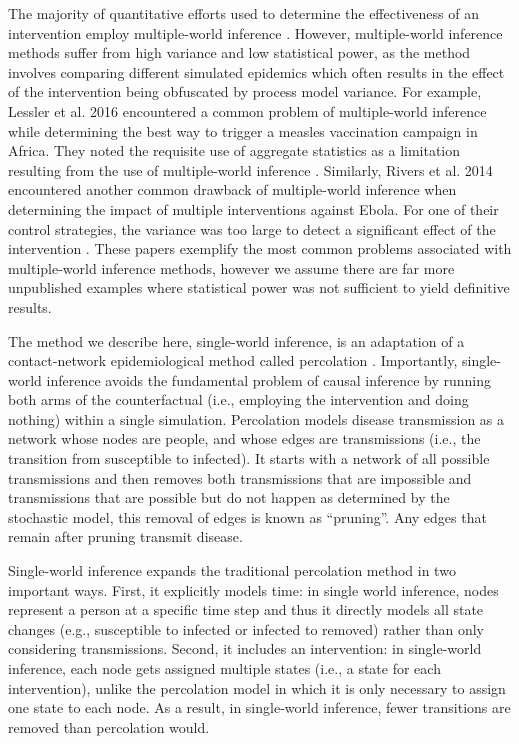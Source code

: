 \documentclass[PTRSB]{rsos}
\begin{document}
\begin{multicols}{2}
The majority of quantitative efforts used to determine the effectiveness of an intervention employ multiple-world inference \cite{lessler-et-al:2016,rivers-et-al:2014,daughton-et-al:2017,longini-et-al:2005}.
However, multiple-world inference methods suffer from high variance and low statistical power, as the method involves comparing different simulated epidemics which often results in the effect of the intervention being obfuscated by process model variance.
For example, Lessler et al. 2016 encountered a common problem of multiple-world inference while determining the best way to trigger a measles vaccination campaign in Africa. 
They noted the requisite use of aggregate statistics as a limitation resulting from the use of multiple-world inference \cite{lessler-et-al:2016}.
Similarly, Rivers et al. 2014 encountered another common drawback of multiple-world inference when determining the impact of multiple interventions against Ebola.
For one of their control strategies, the variance was too large to detect a significant effect of the intervention \cite{rivers-et-al:2014}.
These papers exemplify the most common problems associated with multiple-world inference methods, however we assume there are far more unpublished examples where statistical power was not sufficient to yield definitive results.

The method we describe here, single-world inference, is an adaptation of a contact-network epidemiological method called percolation \cite{miller-book}.
Importantly, single-world inference avoids the fundamental problem of causal inference by running both arms of the counterfactual (i.e., employing the intervention and doing nothing) within a single simulation.
Percolation models disease transmission as a network whose nodes are people, and whose edges are transmissions (i.e., the transition from susceptible to infected).
It starts with a network of all possible transmissions and then removes both transmissions that are impossible and transmissions that are possible but do not happen as determined by the stochastic model, this removal of edges is known as ``pruning''.
Any edges that remain after pruning transmit disease.

Single-world inference expands the traditional percolation method in two important ways.
First, it explicitly models time: in single world inference, nodes represent a person at a specific time step and thus it directly models all state changes (e.g., susceptible to infected or infected to removed) rather than only considering transmissions.
Second, it includes an intervention: in single-world inference, each node gets assigned multiple states (i.e., a state for each intervention), unlike the percolation model in which it is only necessary to assign one state to each node.
As a result, in single-world inference, fewer transitions are removed than percolation would.


\end{multicols}
\end{document}
